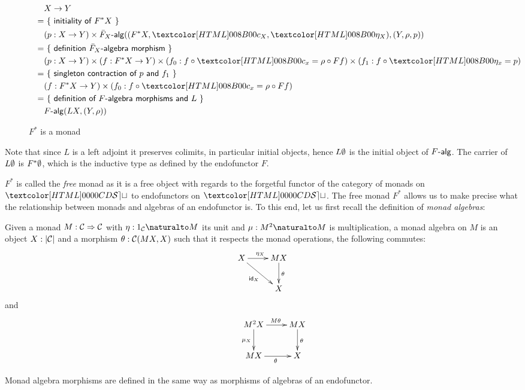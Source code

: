 \begin{figure}
  \centering
    \begin{align*}
    &&&X \to Y \\
    &&=&\ \reasontext{initiality of $F^* X$} \\
    &&&(p : X \to Y) \times \algcat{\bar{F}_X}((F^* X , \Fstarc_X , \Fstareta_X),(Y,\rho,p)) \\
    &&=&\ \reasontext{definition $\bar{F}_X$-algebra morphism} \\
    &&&(p : X \to Y) \times (f : F^* X \to Y) \times (f_0 : f \circ \Fstarc_x = \rho \circ Ff) \times (f_1 : f \circ \Fstareta_x = p) \\
    &&=&\ \reasontext{singleton contraction of $p$ and $f_1$} \\
    &&&(f : F^* X \to Y) \times (f_0 : f \circ \Fstarc_x = \rho \circ Ff) \\
    &&=&\ \reasontext{definition of $F$-algebra morphisms and $L$} \\
    &&&\algcat{F}(L X , (Y,\rho))
  \end{align*}
  \caption{$F^*$ is a monad}
  \label{f-star-monad}
\end{figure}

Note that since $L$ is a left adjoint it preserves colimits, in
particular initial objects, hence $L \emptyset$ is the initial object
of $\algcat{F}$. The carrier of $L \emptyset$ is $F^* \emptyset$, which
is the inductive type as defined by the endofunctor $F$.

$F^*$ is called the \emph{free} monad as it is a free object with
regards to the forgetful functor of the category of monads on $\SET$
to endofunctors on $\SET$. The free monad $F^*$ allows us to make
precise what the relationship between monads and algebras of an
endofunctor is. To this end, let us first recall the definition of
\emph{monad algebras}:

\begin{definition}
  Given a monad $M : \mathcal{C} \Rightarrow \mathcal{C}$ with $\eta : \Nat{1_{\Cc}}{M}$
  its unit and $\mu : \Nat{M^2}{M}$ is multiplication, a monad algebra
  on $M$ is an object $X : | \mathcal{C} |$ and a morphism
  $\theta : \mathcal{C}(MX,X)$ such that it respects the monad operations, \ie
  the following commutes:
  $$
  \xymatrix{
    X \ar[r]^{\eta_X} \ar[dr]_{\id_X} &MX \ar[d]^{\theta} \\
    &X }
  $$
  and
  $$
  \xymatrix{
    &M^2 X \ar[r]^{M \theta} \ar[d]_{\mu_X} &MX \ar[d]^{\theta} \\
    &MX \ar[r]_{\theta} &X }
  $$
  
  Monad algebra morphisms are defined in the same way as morphisms of
  algebras of an endofunctor.
\end{definition}

